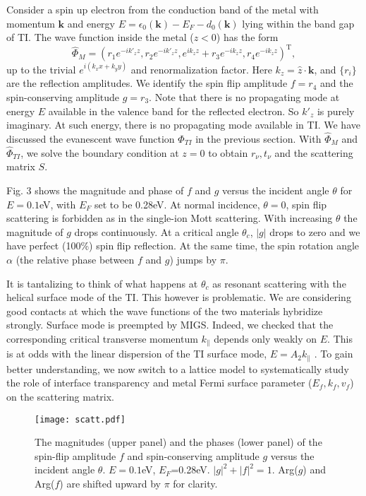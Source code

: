 \documentclass[11pt]{report}
\def\v#1{\mathbf{#1}}
\begin{document}
Consider a spin up electron from the conduction band of the metal 
with momentum $\v{k}$ and energy $E=
\epsilon_0(\v{k})-E_F-d_0(\v{k})$ lying within the band gap of TI.
The wave function inside the metal ($z<0$) has the form
\[
\hat{\Phi}_M=(r_1e^{-ik'_{z} z},r_2e^{-ik'_{z}z},e^{ik_{z}z}+r_3 e^{-ik_{z}z} ,r_4 e^{-ik_{z}z})^{\mathrm{T}},
\]
up to the trivial $e^{i(k_x x+k_y y)}$ and renormalization factor.
Here $k_z=\hat{z}\cdot\v{k}$, and $\{r_i\}$ are the reflection amplitudes. We identify 
the spin flip amplitude $f=r_4$ and the spin-conserving amplitude $g=r_3$. Note that 
there is no propagating mode at energy $E$ available in the valence band 
for the reflected electron. So $k'_z$ is purely imaginary. 
%
At such energy, there is no propagating mode available in TI. We have discussed the 
evanescent wave function $\hat{\Phi}_{TI}$ in the previous section.
With $\hat{\Phi}_{M}$ and $\hat{\Phi}_{TI}$, we solve the boundary condition at $z=0$ 
to obtain $r_\nu, t_\nu$ and the scattering matrix $S$. 

Fig. 3 shows the magnitude and phase of $f$ and $g$ versus the incident angle $\theta$ for $E=0.1$eV, with $E_F$ set to be 0.28eV. At normal incidence, $\theta=0$, spin flip scattering
is forbidden as in the single-ion Mott scattering. With increasing $\theta$ the magnitude of $g$ drops continuously. At a critical angle $\theta_c$, $|g|$ drops to zero and we have perfect (100\%) spin flip reflection.
At the same time, the spin rotation angle $\alpha$ (the relative phase between $f$ and $g$)
jumps by $\pi$.

It is tantalizing to think of what happens at $\theta_c$ as resonant scattering
with the helical surface mode of the TI. This however is problematic.
We are considering good contacts at which the wave functions of the two materials hybridize strongly. 
Surface mode is preempted by MIGS. Indeed, we checked that the corresponding critical 
transverse momentum $k_\parallel$ depends only weakly on $E$. This is at odds with
the linear dispersion of the TI surface mode, $E=A_2k_\parallel$ \cite{zhang2009}. To gain better
understanding, we now switch to a lattice model to systematically study the role of interface 
transparency and metal Fermi surface parameter ($E_f, k_f, v_f$) on the scattering matrix. 



\begin{figure}
\texttt{[image: scatt.pdf]}
\caption{ The magnitudes (upper panel) and the phases (lower panel) of the spin-flip 
amplitude $f$ and spin-conserving amplitude $g$ versus the incident angle $\theta$.
$E=0.1$eV, $E_F$=0.28eV. $|g|^2+|f|^2=1$. Arg($g$) and Arg($f$) 
are shifted upward by $\pi$ for clarity.}
\end{figure}
\end{document}
